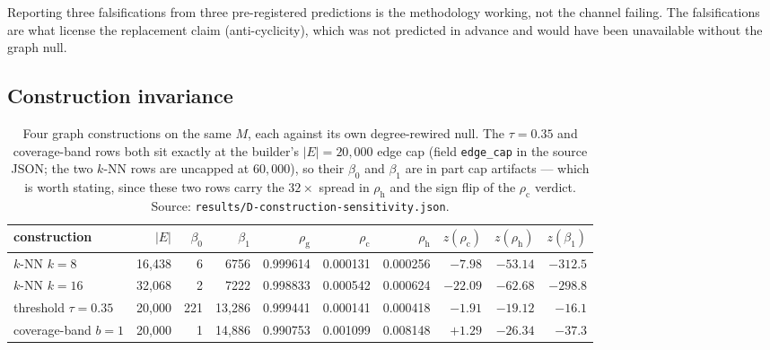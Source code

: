\documentclass[11pt,a4paper]{article}
\theoremstyle{plain}
\theoremstyle{remark}
\theoremstyle{plain}
\begin{document}
Reporting three falsifications from three pre-registered predictions is the methodology working, not the channel failing. The falsifications are what license the replacement claim (anti-cyclicity), which was not predicted in advance and would have been unavailable without the graph null.

\subsection{Construction invariance}

\begin{table}[h]
\centering
\small
\begin{tabular}{lrrrrrrrrr}
\toprule
construction & $|E|$ & $\beta_0$ & $\beta_1$ & $\rho_{\mathrm g}$ & $\rho_{\mathrm c}$ & $\rho_{\mathrm h}$ & $z(\rho_{\mathrm c})$ & $z(\rho_{\mathrm h})$ & $z(\beta_1)$ \\
\midrule
$k$-NN $k{=}8$ & 16{,}438 & 6 & 6756 & 0.999614 & 0.000131 & 0.000256 & $-7.98$ & $-53.14$ & $-312.5$ \\
$k$-NN $k{=}16$ & 32{,}068 & 2 & 7222 & 0.998833 & 0.000542 & 0.000624 & $-22.09$ & $-62.68$ & $-298.8$ \\
threshold $\tau{=}0.35$ & 20{,}000 & 221 & 13{,}286 & 0.999441 & 0.000141 & 0.000418 & $-1.91$ & $-19.12$ & $-16.1$ \\
coverage-band $b{=}1$ & 20{,}000 & 1 & 14{,}886 & 0.990753 & 0.001099 & 0.008148 & $+1.29$ & $-26.34$ & $-37.3$ \\
\bottomrule
\end{tabular}
\caption{Four graph constructions on the same $M$, each against its own degree-rewired null. The $\tau{=}0.35$ and coverage-band rows both sit exactly at the builder's $|E|=20{,}000$ edge cap (field \texttt{edge\_cap} in the source JSON; the two $k$-NN rows are uncapped at $60{,}000$), so their $\beta_0$ and $\beta_1$ are in part cap artifacts --- which is worth stating, since these two rows carry the $32\times$ spread in $\rho_{\mathrm h}$ and the sign flip of the $\rho_{\mathrm c}$ verdict. Source: \texttt{results/D-construction-sensitivity.json}.}
\label{tab:construction}
\end{table}
\end{document}
